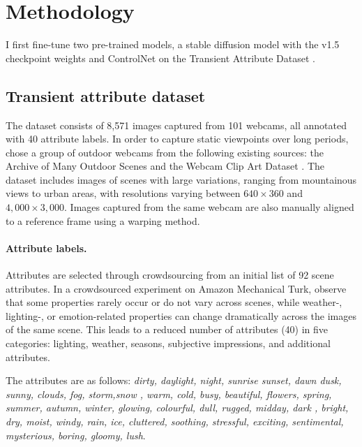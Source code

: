 \section{Methodology}
I first fine-tune two pre-trained models,  a stable diffusion model with the v1.5 checkpoint weights \cite{rombach2022high} and ControlNet \cite{zhang2023adding} on the Transient Attribute Dataset \cite{laffont2014transient}. 

\subsection{Transient attribute dataset} 

The dataset consists of 8,571 images captured from 101 webcams, all annotated with 40 attribute labels. In order to capture static viewpoints over long periods, \citeauthor{laffont2014transient} \cite{laffont2014transient} chose a group of outdoor webcams from the following existing sources: the Archive of Many Outdoor Scenes \cite{jacobs2007consistent} and the Webcam Clip Art Dataset \cite{lalonde2009webcam}. The dataset includes images of scenes with large variations, ranging from mountainous views to urban areas, with resolutions varying between $640 \times 360$ and $4,000 \times 3,000$. Images captured from the same webcam are also manually aligned to a reference frame using a warping method.

\paragraph{Attribute labels.} Attributes are selected through crowdsourcing from an initial list of 92 scene attributes. In a crowdsourced experiment on Amazon Mechanical Turk, \citeauthor{laffont2014transient} \cite{laffont2014transient} observe that some properties rarely occur or do not vary across scenes, while weather-, lighting-, or emotion-related properties can change dramatically across the images of the same scene. This leads to a reduced number of attributes (40) in five categories: lighting, weather, seasons, subjective impressions, and additional attributes.

The attributes are as follows: \textit{dirty, daylight, night, sunrise sunset, dawn dusk, sunny, clouds, fog, storm,snow
, warm, cold, busy, beautiful, flowers, spring, summer, autumn, winter, glowing, colourful, dull, rugged, midday, dark
, bright, dry, moist, windy, rain, ice, cluttered, soothing, stressful, exciting, sentimental, mysterious, boring, gloomy, lush}.

